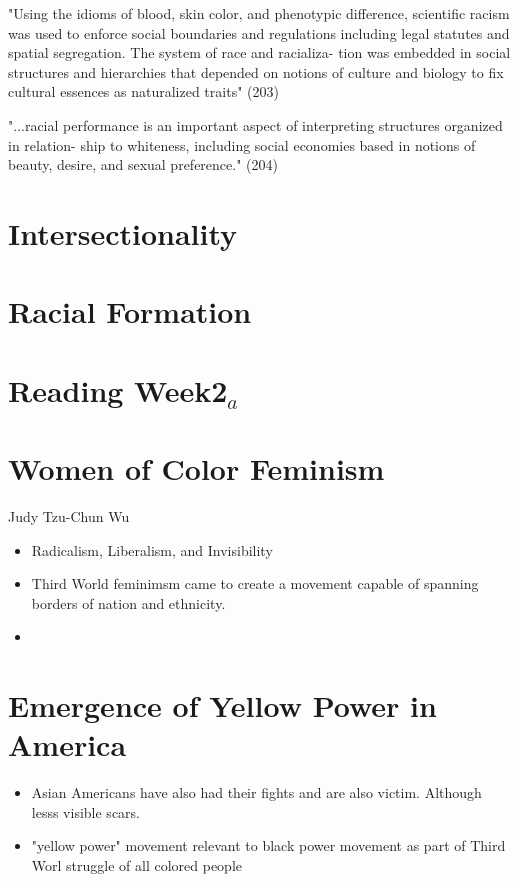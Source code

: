 \documentclass{article}
\begin{document}
"Using the idioms of blood, skin color, and phenotypic
difference, scientific racism was used to enforce social
boundaries and regulations including legal statutes and
spatial segregation. The system of race and racializa-
tion was embedded in social structures and hierarchies
that depended on notions of culture and biology to fix
cultural essences as naturalized traits" (203)

"...racial performance is an important
aspect of interpreting structures organized in relation-
ship to whiteness, including social economies based in
notions of beauty, desire, and sexual preference." (204)



\section{Intersectionality}

\section{Racial Formation}

\section*{Reading Week2$_{a}$}

\section{Women of Color Feminism}
Judy Tzu-Chun Wu
\begin{itemize}
  \item Radicalism, Liberalism, and Invisibility
  \item Third World feminimsm came to create a movement 
    capable of spanning borders of nation and ethnicity.
  \item 
\end{itemize}

\section{Emergence of Yellow Power in America}
\begin{itemize}
  \item Asian Americans have also had their fights
    and are also victim. Although lesss visible scars.
  \item "yellow power" movement relevant to black power
    movement as part of Third Worl struggle of all colored people
\end{itemize}
\end{document}
